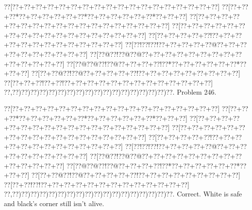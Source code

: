 \documentclass[a5paper]{article}
\begin{document}
\begin{center}
{\goo
\0??[\0??+\0??+\0??+\0??+\0??+\0??+\0??+\0??+\0??+\0??+\0??+\0??+\0??+\0??+\0??+\0??+\0??+\0??]
\0??[\0??+\0??+\0??*\0??+\0??+\0??+\0??+\0??+\0??*\0??+\0??+\0??+\0??+\0??+\0??*\0??+\0??+\0??]
\0??[\0??+\0??+\0??+\0??+\0??+\0??+\0??+\0??+\0??+\0??+\0??+\0??+\0??+\0??+\0??+\0??+\0??+\0??]
\0??[\0??+\0??+\0??+\0??+\0??+\0??+\0??+\0??+\0??+\0??+\0??+\0??+\0??+\0??+\0??+\0??+\0??+\0??]
\0??[\0??+\0??+\0??+\0??+\0??!\0??+\0??+\0??+\0??+\0??+\0??+\0??+\0??+\0??+\0??+\0??+\0??+\0??]
\0??[\0??!\0??!\0??!\0??+\0??+\0??+\0??+\0??@\0??+\0??+\0??+\0??+\0??+\0??+\0??+\0??+\0??+\0??]
\0??[\0??@\0??!\0??@\0??@\0??+\0??+\0??+\0??+\0??+\0??+\0??+\0??+\0??+\0??+\0??+\0??+\0??+\0??]
\0??[\0??@\0??@\0??!\0??@\0??+\0??+\0??+\0??!\0??*\0??+\0??+\0??+\0??+\0??+\0??*\0??+\0??+\0??]
\0??[\0??+\0??@\0??!\0??@\0??+\0??+\0??+\0??+\0??!\0??+\0??+\0??+\0??+\0??+\0??+\0??+\0??+\0??]
\0??[\0??+\0??+\0??!\0??+\0??!\0??+\0??+\0??+\0??+\0??+\0??+\0??+\0??+\0??+\0??+\0??+\0??+\0??]
\0??,\0??)\0??)\0??)\0??)\0??)\0??)\0??)\0??)\0??)\0??)\0??)\0??)\0??)\0??)\0??)\0??)\0??)\0??.
}
Problem 246.

\end{center}
\begin{center}
{\goo
\0??[\0??+\0??+\0??+\0??+\0??+\0??+\0??+\0??+\0??+\0??+\0??+\0??+\0??+\0??+\0??+\0??+\0??+\0??]
\0??[\0??+\0??+\0??*\0??+\0??+\0??+\0??+\0??+\0??*\0??+\0??+\0??+\0??+\0??+\0??*\0??+\0??+\0??]
\0??[\0??+\0??+\0??+\0??+\0??+\0??+\0??+\0??+\0??+\0??+\0??+\0??+\0??+\0??+\0??+\0??+\0??+\0??]
\0??[\0??+\0??+\0??+\0??+\0??+\0??+\0??+\0??+\0??+\0??+\0??+\0??+\0??+\0??+\0??+\0??+\0??+\0??]
\0??[\0??+\0??+\0??+\0??+\0??!\0??+\0??+\0??+\0??+\0??+\0??+\0??+\0??+\0??+\0??+\0??+\0??+\0??]
\0??[\0??!\0??!\0??!\0??+\0??+\0??+\0??+\0??@\0??+\0??+\0??+\0??+\0??+\0??+\0??+\0??+\0??+\0??]
\0??[\0??@\0??!\0??@\0??@\0??+\0??+\0??+\0??+\0??+\0??+\0??+\0??+\0??+\0??+\0??+\0??+\0??+\0??]
\0??[\0??@\0??@\0??!\0??@\0??+\0??+\0??+\0??!\0??*\0??+\0??+\0??+\0??+\0??+\0??*\0??+\0??+\0??]
\0??[\0??+\0??@\0??!\0??@\0??+\0??+\0??+\0??+\0??!\0??+\0??+\0??+\0??+\0??+\0??+\0??+\0??+\0??]
\0??[\0??+\0??!\0??!\0??+\0??+\0??+\0??+\0??+\0??+\0??+\0??+\0??+\0??+\0??+\0??+\0??]
\0??,\0??)\0??)\0??)\0??)\0??)\0??)\0??)\0??)\0??)\0??)\0??)\0??)\0??)\0??)\0??)\0??)\0??)\0??.
}
Correct. White is safe and black's corner still isn't alive.

\end{center}
\end{document}

